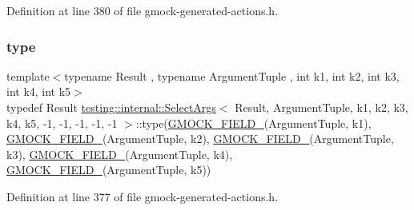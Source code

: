 Definition at line 380 of file gmock-\/generated-\/actions.\+h.

\mbox{\label{classtesting_1_1internal_1_1SelectArgs_3_01Result_00_01ArgumentTuple_00_01k1_00_01k2_00_01k3_00_dabb861d0dfd59e876e4adc8d7e61c25_a64b825d66ab0457b44e260b2fd7e1946}} 
\subsubsection{\texorpdfstring{type}{type}}
{\footnotesize\ttfamily template$<$typename Result , typename Argument\+Tuple , int k1, int k2, int k3, int k4, int k5$>$ \\
typedef Result \hyperlink{classtesting_1_1internal_1_1SelectArgs}{testing\+::internal\+::\+Select\+Args}$<$ Result, Argument\+Tuple, k1, k2, k3, k4, k5, -\/1, -\/1, -\/1, -\/1, -\/1 $>$\+::type(\hyperlink{gmock-generated-actions_8h_a6eb3ce92b0613603057a20ec9e593317}{G\+M\+O\+C\+K\+\_\+\+F\+I\+E\+L\+D\+\_\+}(Argument\+Tuple, k1), \hyperlink{gmock-generated-actions_8h_a6eb3ce92b0613603057a20ec9e593317}{G\+M\+O\+C\+K\+\_\+\+F\+I\+E\+L\+D\+\_\+}(Argument\+Tuple, k2), \hyperlink{gmock-generated-actions_8h_a6eb3ce92b0613603057a20ec9e593317}{G\+M\+O\+C\+K\+\_\+\+F\+I\+E\+L\+D\+\_\+}(Argument\+Tuple, k3), \hyperlink{gmock-generated-actions_8h_a6eb3ce92b0613603057a20ec9e593317}{G\+M\+O\+C\+K\+\_\+\+F\+I\+E\+L\+D\+\_\+}(Argument\+Tuple, k4), \hyperlink{gmock-generated-actions_8h_a6eb3ce92b0613603057a20ec9e593317}{G\+M\+O\+C\+K\+\_\+\+F\+I\+E\+L\+D\+\_\+}(Argument\+Tuple, k5))}



Definition at line 377 of file gmock-\/generated-\/actions.\+h.



